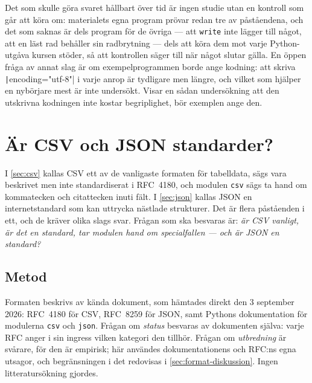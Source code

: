 Det som skulle göra svaret hållbart över tid är ingen studie utan en
kontroll som går att köra om: materialets egna program prövar redan tre
av påståendena, och det som saknas är dels program för de övriga --- att
\texttt{write} inte lägger till något, att en läst rad
behåller sin radbrytning --- dels att köra dem mot varje Python-utgåva
kursen stöder, så att kontrollen säger till när något slutar gälla.  En öppen
fråga av annat slag är om exempelprogrammen borde ange kodning: att
skriva \texttt|encoding="utf-8"| i varje anrop är
tydligare men längre, och vilket som hjälper en nybörjare mest är inte
undersökt.  Visar en sådan undersökning att den utskrivna kodningen
inte kostar begriplighet, bör exemplen ange den.


\chapter{Är CSV och JSON standarder?}
\label{app:format}

I \cref{sec:csv} kallas CSV ett av de vanligaste formaten för
tabelldata, sägs vara beskrivet men inte standardiserat i RFC~4180, och
modulen \texttt{csv} sägs ta hand om kommatecken och
citattecken inuti fält.  I \cref{sec:json} kallas JSON en
internetstandard som kan uttrycka nästlade strukturer.  Det är flera
påståenden i ett, och de kräver olika slags svar.  Frågan som ska
besvaras är: \emph{är CSV vanligt, är det en standard, tar modulen hand
om specialfallen --- och är JSON en standard?}

\section{Metod}
\label{sec:format-metod}

Formaten beskrivs av kända dokument, som hämtades direkt den 3 september
2026: RFC~4180 för CSV\autocite{RFC4180}, RFC~8259 för
JSON\autocite{RFC8259}, samt Pythons dokumentation för modulerna
\texttt{csv}\autocite{PythonCSV} och
\texttt{json}\autocite{PythonJSON}.  Frågan om
\emph{status} besvaras av dokumenten själva: varje RFC anger i sin
ingress vilken kategori den tillhör.  Frågan om \emph{utbredning} är
svårare, för den är empirisk; här användes dokumentationens och RFC:ns
egna utsagor, och begränsningen i det redovisas i
\cref{sec:format-diskussion}.  Ingen litteratursökning gjordes.

